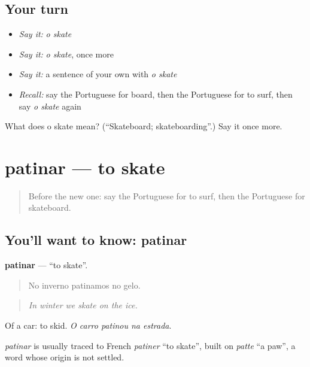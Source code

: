 \subsection*{Your turn}
\begin{itemize}
\raggedright
  \item \emph{Say it:} \emph{o skate}
  \item \emph{Say it:} \emph{o skate}, once more
  \item \emph{Say it:} a sentence of your own with \emph{o skate}
  \item \emph{Recall:} say the Portuguese for board, then the Portuguese for to surf, then say \emph{o skate} again
\end{itemize}

\begin{tcolorbox}[breakable,colback=teal!4,colframe=teal!35!black,title={Before you move on}]
What does o skate mean? (\textquotedblleft{}Skateboard; skateboarding\textquotedblright{}.) Say it once more.
\end{tcolorbox}
\section[patinar]{patinar — to skate}

\label{lesson:PT-C507-patinar}



\begin{quote}
Before the new one: say the Portuguese for to surf, then the Portuguese for skateboard.
\end{quote}

\subsection*{You'll want to know: patinar}
\textbf{patinar} — \textquotedblleft{}to skate\textquotedblright{}.

\begin{quote}
No inverno patinamos no gelo.
\end{quote}

\begin{quote}
\emph{In winter we skate on the ice.}
\end{quote}

Of a car: to skid. \emph{O carro patinou na estrada}.

\begin{cousinweb}
\emph{patinar} is usually traced to French \emph{patiner} \textquotedblleft{}to skate\textquotedblright{}, built on \emph{patte} \textquotedblleft{}a paw\textquotedblright{}, a word whose origin is not settled.
\end{cousinweb}


